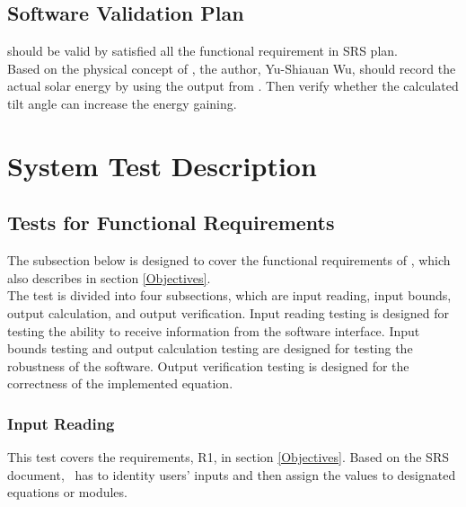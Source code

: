 \documentclass[12pt, titlepage]{article}
\begin{document}
\subsection{Software Validation Plan}

\progname should be valid by satisfied all the functional requirement in SRS 
plan.\\
Based on the physical concept of \progname, the author, Yu-Shiauan Wu, should
record the actual solar energy by using the output from \progname. Then verify
whether the calculated tilt angle can increase the energy gaining.


\section{System Test Description}\label{STD}	
\subsection{Tests for Functional Requirements}

The subsection below is designed to cover the functional requirements of
\progname, which also describes in section \ref{Objectives}.\\
The test is divided into four subsections, which are input reading, input
bounds,
output calculation, and output verification. Input reading testing is designed
for
testing the ability to receive information from the software interface. Input
bounds
testing and output calculation testing are designed for testing the robustness
of the
software. Output verification testing is designed for the correctness of the 
implemented equation.

 

\subsubsection{Input Reading}

This test covers the requirements, R1, in section \ref{Objectives}. Based on
the SRS document\cite{YS2019}, \progname ~has to identity users' inputs and
then assign the values to designated equations or modules.
\end{document}
